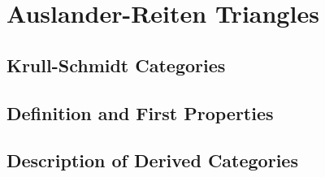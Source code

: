 \documentclass[12pt]{article}
\theoremstyle{definition}
\theoremstyle{remark}
\begin{document}
    \section{Auslander-Reiten Triangles}

        \subsection{Krull-Schmidt Categories}

        \subsection{Definition and First Properties}

        \subsection{Description of Derived Categories}

    \clearpage

    \nocite{*}
    
    

    \clearpage


\end{document}
